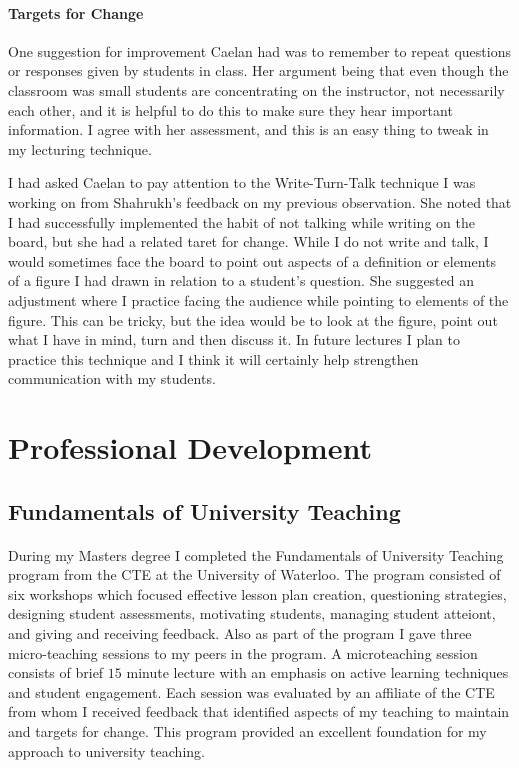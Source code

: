 \documentclass{article}
\begin{document}
\paragraph{Targets for Change}
One suggestion for improvement Caelan had was to remember to repeat questions or responses given by students in class. Her argument being that even though the classroom was small students are concentrating on the instructor, not necessarily each other, and it is helpful to do this to make sure they hear important information. I agree with her assessment, and this is an easy thing to tweak in my lecturing technique.

I had asked Caelan to pay attention to the Write-Turn-Talk technique I was working on from Shahrukh's feedback on my previous observation. She noted that I had successfully implemented the habit of not talking while writing on the board, but she had a related taret for change. While I do not write and talk, I would sometimes face the board to point out aspects of a definition or elements of a figure I had drawn in relation to a student's question. She suggested an adjustment where I practice facing the audience while pointing to elements of the figure. This can be tricky, but the idea would be to look at the figure, point out what I have in mind, turn and then discuss it. In future lectures I plan to practice this technique and I think it will certainly help strengthen communication with my students.

\section{Professional Development}
\subsection{Fundamentals of University Teaching}
\paragraph{}
During my Masters degree I completed the Fundamentals of University Teaching program from the CTE at the University of Waterloo. The program consisted of six workshops which focused effective lesson plan creation, questioning strategies, designing student assessments, motivating students, managing student atteiont, and giving and receiving feedback. Also as part of the program I gave three micro-teaching sessions to my peers in the program. A microteaching session consists of brief $15$ minute lecture with an emphasis on active learning techniques and student engagement. Each session was evaluated by an affiliate of the CTE from whom I received feedback that identified aspects of my teaching to maintain and targets for change. This program provided an excellent foundation for my approach to university teaching.
\end{document}
